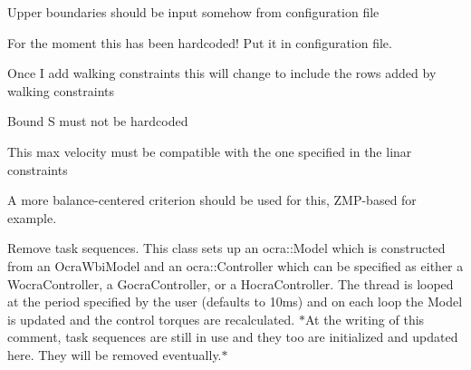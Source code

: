 
\begin{DoxyRefList}
\item[\label{todo__todo000003}%
\hypertarget{todo__todo000003}{}%
\-Member \hyperlink{classConstancy_ae38922343ad8a98bd4e501e8ada5c83c}{\-Constancy\-:\-:\-Constancy} ()]\-Upper boundaries should be input somehow from configuration file  
\item[\label{todo__todo000006}%
\hypertarget{todo__todo000006}{}%
\-Member \hyperlink{classMIQPController_ada92fc35065a11b889019f2948c1888d}{\-M\-I\-Q\-P\-Controller\-:\-:\-\_\-\-Sw} ]\-For the moment this has been hardcoded! \-Put it in configuration file.  
\item[\label{todo__todo000004}%
\hypertarget{todo__todo000004}{}%
\-Member \hyperlink{classMIQPLinearConstraints_a09f79be23a0269104add07a52c52f90f}{\-M\-I\-Q\-P\-Linear\-Constraints\-:\-:\-M\-I\-Q\-P\-Linear\-Constraints} (unsigned int dt, unsigned int \-N)]\-Once \-I add walking constraints this will change to include the rows added by walking constraints  
\item[\label{todo__todo000005}%
\hypertarget{todo__todo000005}{}%
\-Member \hyperlink{classSingleSupport_a78e5b7c89b828d718560cec73c0f6218}{\-Single\-Support\-:\-:build\-Matrix\-Ci} ()]\-Bound \-S must not be hardcoded  
\item[\label{todo__todo000007}%
\hypertarget{todo__todo000007}{}%
\-Member \hyperlink{classStepController_a8f061f201c651d920ca02f7daa07adfe}{\-Step\-Controller\-:\-:initialize} ()]\-This max velocity must be compatible with the one specified in the linar constraints  
\item[\label{todo__todo000002}%
\hypertarget{todo__todo000002}{}%
\-Member \hyperlink{classSteppingDemoClient_ad8fbc186267a47a73bb77e78199f2b8c}{\-Stepping\-Demo\-Client\-:\-:is\-Balanced} ()]\-A more balance-\/centered criterion should be used for this, \-Z\-M\-P-\/based for example.  
\item[\label{todo__todo000001}%
\hypertarget{todo__todo000001}{}%
\-Class \hyperlink{classThread}{\-Thread} ]\-Remove task sequences. \-This class sets up an ocra\-::\-Model which is constructed from an \-Ocra\-Wbi\-Model and an ocra\-::\-Controller which can be specified as either a \-Wocra\-Controller, a \-Gocra\-Controller, or a \-Hocra\-Controller. \-The thread is looped at the period specified by the user (defaults to 10ms) and on each loop the \-Model is updated and the control torques are recalculated. $\ast$\-At the writing of this comment, task sequences are still in use and they too are initialized and updated here. \-They will be removed eventually.$\ast$  

\end{DoxyRefList}

